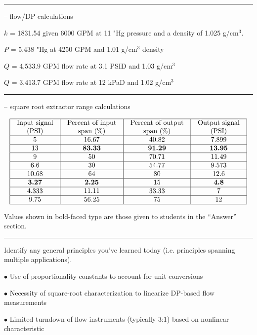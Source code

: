 \filbreak \vskip 5pt \hrule \vskip 5pt  -- flow/DP calculations \vskip 10pt

$k$ = 1831.54 given 6000 GPM at 11 "Hg pressure and a density of 1.025 g/cm$^{3}$.

\vskip 10pt

$P$ = 5.438 "Hg at 4250 GPM and 1.01 g/cm$^{3}$ density

\vskip 10pt

$Q$ = 4,533.9 GPM flow rate at 3.1 PSID and 1.03 g/cm$^{3}$

\vskip 10pt

$Q$ = 3,413.7 GPM flow rate at 12 kPaD and 1.02 g/cm$^{3}$


\filbreak \vskip 5pt \hrule \vskip 5pt  -- square root extractor range calculations \vskip 10pt


$$\vbox{\offinterlineskip
\halign{\strut
\vrule \quad\hfil # \ \hfil & 
\vrule \quad\hfil # \ \hfil & 
\vrule \quad\hfil # \ \hfil & 
\vrule \quad\hfil # \ \hfil \vrule \cr
\noalign{\hrule}
%
Input signal & Percent of input & Percent of output & Output signal \cr
%
(PSI) & span (\%) & span (\%) & (PSI) \cr
%
\noalign{\hrule}
%
5 & 16.67 & 40.82 & 7.899 \cr
%
\noalign{\hrule}
%
13 & {\bf 83.33} & {\bf 91.29} & {\bf 13.95} \cr
%
\noalign{\hrule}
%
9 & 50 & 70.71 & 11.49 \cr
%
\noalign{\hrule}
%
6.6 & 30 & 54.77 & 9.573 \cr
%
\noalign{\hrule}
%
10.68 & 64 & 80 & 12.6 \cr
%
\noalign{\hrule}
%
{\bf 3.27} & {\bf 2.25} & 15 & {\bf 4.8} \cr
%
\noalign{\hrule}
%
4.333 & 11.11 & 33.33 & 7 \cr
%
\noalign{\hrule}
%
9.75 & 56.25 & 75 & 12 \cr
%
\noalign{\hrule}
} %
}$$ %

Values shown in bold-faced type are those given to students in the ``Answer'' section.


\filbreak \vskip 5pt \hrule \vskip 5pt  \vskip 10pt

\noindent
Identify any general principles you've learned today (i.e. principles spanning multiple applications).
\item{$\bullet$} Use of proportionality constants to account for unit conversions
\item{$\bullet$} Necessity of square-root characterization to linearize DP-based flow measurements
\item{$\bullet$} Limited turndown of flow instruments (typically 3:1) based on nonlinear characteristic
\medskip

